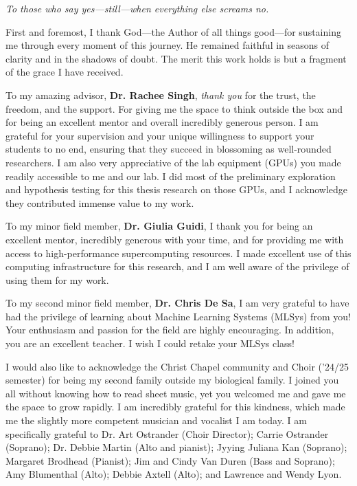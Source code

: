 \begin{dedication}
    \textit{To those who say yes—still—when everything else screams no.}
\end{dedication}

\begin{acknowledgements}
    First and foremost, I thank God—the Author of all things good—for sustaining me through every moment of this journey.
    He remained faithful in seasons of clarity and in the shadows of doubt.
    The merit this work holds is but a fragment of the grace I have received.

    To my amazing advisor, \textbf{Dr. Rachee Singh}, \emph{thank you} for the trust, the freedom, and the support.
    For giving me the space to think outside the box and for being an excellent mentor and overall incredibly generous
    person.
    I am grateful for your supervision and your unique willingness to support your students to no end,
    ensuring that they succeed in blossoming as well-rounded researchers.
    I am also very appreciative of the lab equipment (GPUs) you made readily accessible to me and our lab.
    I did most of the preliminary exploration and hypothesis testing for this thesis research on those GPUs,
    and I acknowledge they contributed immense value to my work.

    To my minor field member, \textbf{Dr. Giulia Guidi}, I thank you for being an excellent mentor,
    incredibly generous with your time, and for providing
    me with access to high-performance supercomputing resources.
    I made excellent use of this computing infrastructure for this research,
    and I am well aware of the privilege of using them for my work.

    To my second minor field member, \textbf{Dr. Chris De Sa}, I am very grateful to have had the privilege of learning
    about Machine Learning Systems (MLSys) from you!
    Your enthusiasm and passion for the field are highly encouraging.
    In addition, you are an excellent teacher.
    I wish I could retake your MLSys class!

    I would also like to acknowledge the Christ Chapel community and Choir ('24/25 semester) for being my second family outside
    my biological family.
    I joined you all without knowing how to read sheet music, yet you welcomed me and gave me the space to grow rapidly.
    I am incredibly grateful for this kindness, which made me the slightly more competent musician and
    vocalist I am today.
    I am specifically grateful to Dr. Art Ostrander (Choir Director);
    Carrie Ostrander (Soprano); Dr. Debbie Martin (Alto and pianist); Jyying Juliana Kan (Soprano);
    Margaret Brodhead (Pianist); Jim and Cindy Van Duren (Bass and Soprano);
    Amy Blumenthal (Alto); Debbie Axtell (Alto); and Lawrence and Wendy Lyon.


\end{acknowledgements}
